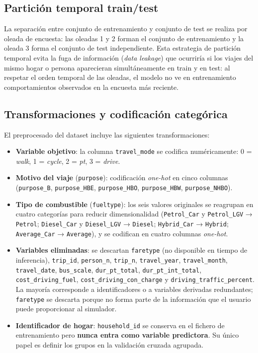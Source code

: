 \subsection{Partición temporal train/test}

La separación entre conjunto de entrenamiento y conjunto de test se realiza por oleada de encuesta: las oleadas 1 y 2 forman el conjunto de entrenamiento y la oleada 3 forma el conjunto de test independiente. Esta estrategia de partición temporal evita la fuga de información (\textit{data leakage}) que ocurriría si los viajes del mismo hogar o persona aparecieran simultáneamente en train y en test: al respetar el orden temporal de las oleadas, el modelo no ve en entrenamiento comportamientos observados en la encuesta más reciente.

\subsection{Transformaciones y codificación categórica}

El preprocesado del dataset incluye las siguientes transformaciones:

\begin{itemize}
  \item \textbf{Variable objetivo}: la columna \texttt{travel\_mode} se codifica numéricamente: 0 = \textit{walk}, 1 = \textit{cycle}, 2 = \textit{pt}, 3 = \textit{drive}.
  \item \textbf{Motivo del viaje} (\texttt{purpose}): codificación \textit{one-hot} en cinco columnas (\texttt{purpose\_B}, \texttt{purpose\_HBE}, \texttt{purpose\_HBO}, \texttt{purpose\_HBW}, \texttt{purpose\_NHBO}).
  \item \textbf{Tipo de combustible} (\texttt{fueltype}): los seis valores originales se reagrupan en cuatro categorías para reducir dimensionalidad (\texttt{Petrol\_Car} y \texttt{Petrol\_LGV} → \texttt{Petrol}; \texttt{Diesel\_Car} y \texttt{Diesel\_LGV} → \texttt{Diesel}; \texttt{Hybrid\_Car} → \texttt{Hybrid}; \texttt{Average\_Car} → \texttt{Average}), y se codifican en cuatro columnas \textit{one-hot}.
  \item \textbf{Variables eliminadas}: se descartan \texttt{faretype} (no disponible en tiempo de inferencia), \texttt{trip\_id}, \texttt{person\_n}, \texttt{trip\_n}, \texttt{travel\_year}, \texttt{travel\_month}, \texttt{travel\_date}, \texttt{bus\_scale}, \texttt{dur\_pt\_total}, \texttt{dur\_pt\_int\_total}, \texttt{cost\_driving\_fuel}, \texttt{cost\_driving\_con\_charge} y \texttt{driving\_traffic\_percent}. La mayoría corresponde a identificadores o a variables derivadas redundantes; \texttt{faretype} se descarta porque no forma parte de la información que el usuario puede proporcionar al simulador.
  \item \textbf{Identificador de hogar}: \texttt{household\_id} se conserva en el fichero de entrenamiento pero \textbf{nunca entra como variable predictora}. Su único papel es definir los grupos en la validación cruzada agrupada.
\end{itemize}

